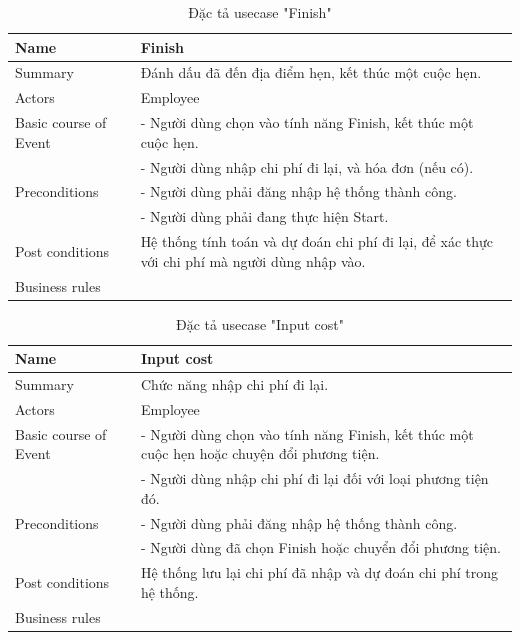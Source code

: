 \documentclass[a4paper]{article}
\begin{document}
\begin{table}[!h]
    \centering
    \begin{tabular}{|m{3.2cm}|m{10.5cm}|}
        \hline
        Name & Finish \\
        \hline
        Summary & Đánh dấu đã đến địa điểm hẹn, kết thúc một cuộc hẹn.\\
        \hline
        Actors & Employee\\
        \hline
        Basic course of Event & -	Người dùng chọn vào tính năng Finish, kết thúc một cuộc hẹn.\\
&-	Người dùng nhập chi phí đi lại, và hóa đơn (nếu có).\\
        \hline
        Preconditions &-	Người dùng  phải đăng nhập hệ thống thành công.\\
&-	Người dùng phải đang thực hiện Start.\\
        \hline
        Post conditions & Hệ thống tính toán và dự đoán chi phí đi lại, để xác thực với chi phí mà người dùng nhập vào.\\
        \hline
        Business rules & \\
        \hline
    \end{tabular}
    \caption{Đặc tả usecase "Finish"}
\end{table}
\begin{table}[!h]
    \centering
    \begin{tabular}{|m{3.2cm}|m{10.5cm}|}
        \hline
        Name & Input cost\\
        \hline
        Summary & Chức năng nhập chi phí đi lại.\\
        \hline
        Actors & Employee\\
        \hline
        Basic course of Event & -	Người dùng chọn vào tính năng Finish, kết thúc một cuộc hẹn hoặc chuyện đổi phương tiện.\\
&-	Người dùng nhập chi phí đi lại đối với loại phương tiện đó.\\
        \hline
        Preconditions & -	Người dùng  phải đăng nhập hệ thống thành công.\\
&-	Người dùng đã chọn Finish hoặc chuyển đổi phương tiện.\\
        \hline
        Post conditions & Hệ thống lưu lại chi phí đã nhập và dự đoán chi phí trong hệ thống.\\
        \hline
        Business rules & \\
        \hline
    \end{tabular}
    \caption{Đặc tả usecase "Input cost"}
\end{table}
\end{document}
